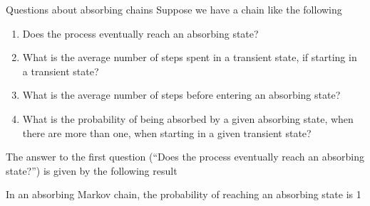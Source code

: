 \documentclass[aspectratio=169]{beamer}\usepackage[]{graphicx}\usepackage[]{xcolor}
\begin{document}
\begin{frame}{Questions about absorbing chains}
Suppose we have a chain like the following
\begin{center}
\end{center}
\vfill
\begin{enumerate}
\item Does the process eventually reach an absorbing state?
\item What is the average number of steps spent in a transient state, if starting in a transient state?
\item What is the average number of steps before entering an absorbing state?
\item What is the probability of being absorbed by a given absorbing state, when there are more than one, when starting in a given transient state?
\end{enumerate}
\end{frame}


\begin{frame}
The answer to the first question (``Does the process eventually reach an absorbing state?'') is given by the following result
\vfill
\begin{theorem}
In an absorbing Markov chain, the probability of reaching an absorbing state is 1
\end{theorem}
\end{frame}
\end{document}
